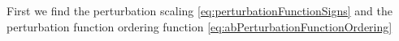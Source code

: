 First we find the perturbation scaling \ref{eq:perturbationFunctionSigns} and the perturbation function ordering function \ref{eq:abPerturbationFunctionOrdering}
